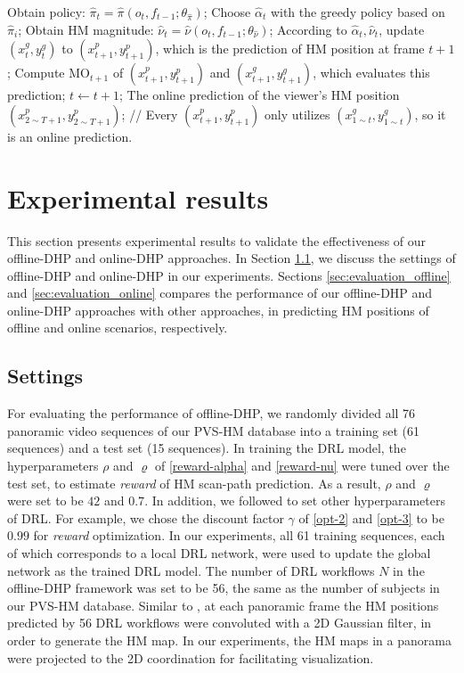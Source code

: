 \documentclass[10pt,journal,compsoc]{IEEEtran}
\begin{document}
\begin{algorithm}
\begin{algorithmic}
       \STATE Obtain policy: $\hat{\pi}_{t}=\hat{\pi}( o_{t}, f_{t-1} ; \theta_{\hat{\pi}})$;
       \STATE Choose $\hat{\alpha}_{t}$ with the greedy policy based on $\hat{\pi}_{i}$;
       \STATE Obtain HM magnitude: $\hat{\nu}_{t}=\hat{\nu}(o_{t}, f_{t-1} ; \theta_{\hat{\nu}})$;
       \STATE According to $\hat{\alpha}_{t},\hat{\nu}_{t}$, update $(x^{g}_{t}, y^{g}_{t})$ to $(x^{p}_{t+1}, y^{p}_{t+1})$, which is the prediction of HM position at frame $t+1$;
       \STATE Compute $\text{MO}_{t+1}$ of $(x^{p}_{t+1},y^{p}_{t+1})$ and $(x^{g}_{t+1},y^{g}_{t+1})$, which evaluates this prediction;
       \STATE $t \leftarrow t+1$;
  \ENDFOR
   The online prediction of the viewer's HM position $(x^{p}_{2 \sim T+1},y^{p}_{2 \sim T+1})$; // Every $(x^{p}_{t+1},y^{p}_{t+1})$ only utilizes $(x^{g}_{1 \sim t},y^{g}_{1 \sim t})$, so it is an online prediction.
\end{algorithmic}
\end{algorithm}

\section{Experimental results}
This section presents experimental results to validate the effectiveness of our offline-DHP and online-DHP approaches. In Section \ref{sec:settings}, we discuss the settings of offline-DHP and online-DHP in our experiments. Sections \ref{sec:evaluation_offline} and \ref{sec:evaluation_online} compares the performance of our offline-DHP and online-DHP approaches with other approaches, in predicting HM positions of offline and online scenarios, respectively.

\subsection{Settings}\label{sec:settings}
For evaluating the performance of offline-DHP, we randomly divided all 76 panoramic video sequences of our PVS-HM database into a training set (61 sequences) and a test set (15 sequences). In training the DRL model, the hyperparameters $\rho$ and $\varrho$ of \eqref{reward-alpha} and \eqref{reward-nu} were tuned over the test set,  to estimate \textit{reward} of HM scan-path prediction. As a result, $\rho$ and $\varrho$ were set to be $42$ and $0.7$. In addition, we followed \cite{mnih2016asynchronous} to set other hyperparameters of DRL. For example, we chose the discount factor $\gamma$ of \eqref{opt-2} and \eqref{opt-3} to be $0.99$ for \textit{reward} optimization. In our experiments, all 61 training sequences, each of which corresponds to a local DRL network, were used to update the global network as the trained DRL model.
The number of DRL workflows $N$ in the offline-DHP framework was set to be 56, the same as the number of subjects in our PVS-HM database.
Similar to \cite{matin1974saccadic},  at each panoramic frame the HM positions predicted by 56 DRL workflows were convoluted with a 2D Gaussian filter, in order to generate the HM map.
In our experiments, the HM maps in a panorama were projected to the 2D coordination for facilitating visualization.
\end{document}
